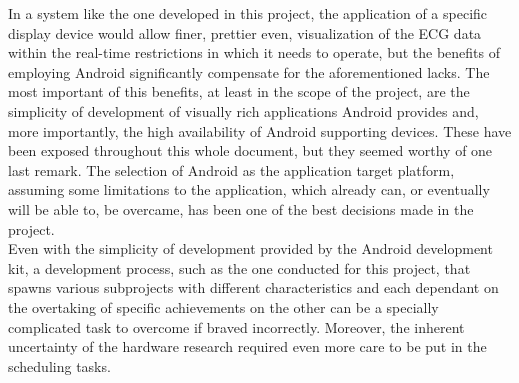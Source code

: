 		In a system like the one developed in this project, the application of a specific display device would allow finer, prettier even, visualization of the ECG data within the real-time restrictions in which it needs to operate, but the benefits of employing Android significantly compensate for the aforementioned lacks. The most important of this benefits, at least in the scope of the project, are the simplicity of development of visually rich applications Android provides and, more importantly, the high availability of Android supporting devices. These have been exposed throughout this whole document, but they seemed worthy of one last remark. The selection of Android as the application target platform, assuming some limitations to the application, which already can, or eventually will be able to, be overcame, has been one of the best decisions made in the project.\\

		Even with the simplicity of development provided by the Android development kit, a development process, such as the one conducted for this project, that spawns various subprojects with different characteristics and each dependant on the overtaking of specific achievements on the other can be a specially complicated task to overcome if braved incorrectly. Moreover, the inherent uncertainty of the hardware research required even more care to be put in the scheduling tasks.\\

